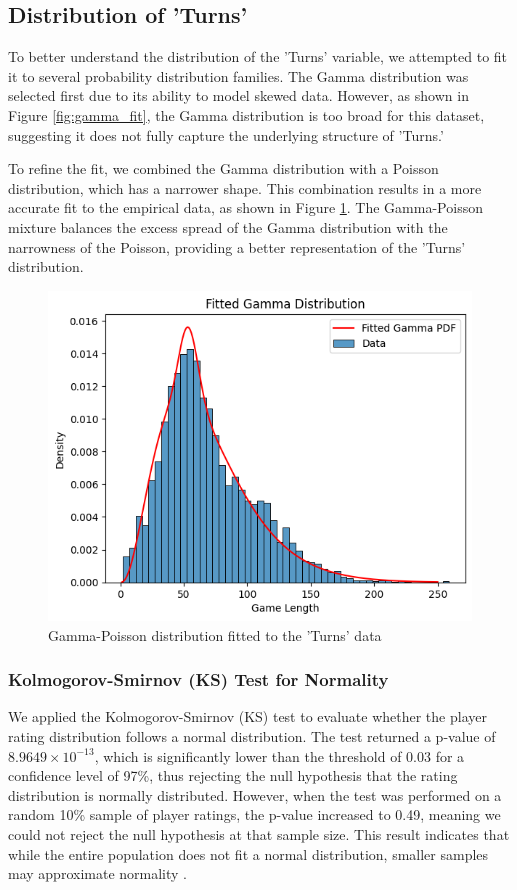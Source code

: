 \documentclass[conference]{IEEEtran}
\begin{document}
\subsection{Distribution of 'Turns'}

To better understand the distribution of the 'Turns' variable, we attempted to fit it to several probability distribution families. The Gamma distribution was selected first due to its ability to model skewed data. However, as shown in Figure \ref{fig:gamma_fit}, the Gamma distribution is too broad for this dataset, suggesting it does not fully capture the underlying structure of 'Turns.'

To refine the fit, we combined the Gamma distribution with a Poisson distribution, which has a narrower shape. This combination results in a more accurate fit to the empirical data, as shown in Figure \ref{fig:gam_poi_fit}. The Gamma-Poisson mixture balances the excess spread of the Gamma distribution with the narrowness of the Poisson, providing a better representation of the 'Turns' distribution.



\begin{figure}[H]
    \centering
    \includegraphics[width=0.8\linewidth]{gam_poi_fit.png}
    \caption{Gamma-Poisson distribution fitted to the 'Turns' data}
    \label{fig:gam_poi_fit}
\end{figure}


\subsubsection{Kolmogorov-Smirnov (KS) Test for Normality}
We applied the Kolmogorov-Smirnov (KS) test to evaluate whether the player rating distribution follows a normal distribution. The test returned a p-value of \(8.9649 \times 10^{-13}\), which is significantly lower than the threshold of \(0.03\) for a confidence level of 97\%, thus rejecting the null hypothesis that the rating distribution is normally distributed. However, when the test was performed on a random 10\% sample of player ratings, the p-value increased to 0.49, meaning we could not reject the null hypothesis at that sample size. This result indicates that while the entire population does not fit a normal distribution, smaller samples may approximate normality \cite{kssample}.
\end{document}

